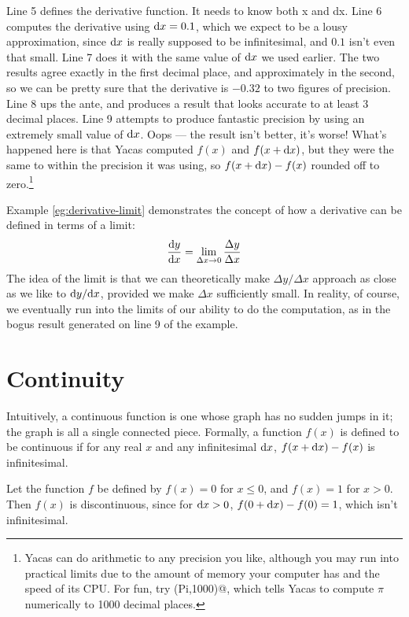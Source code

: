 Line 5 defines the derivative function. It needs to know both x and dx. Line
6 computes the derivative using $\textup{d} x=0.1$, which we expect to be a lousy approximation,
since $\textup{d} x$ is really supposed to be infinitesimal, and $0.1$ isn't even that small.
Line 7 does it with the same value of $\textup{d} x$ we used earlier. The two results agree
exactly in the first decimal place, and approximately in the second, so we can be
pretty sure that the derivative is $-0.32$ to two figures of precision. Line 8
ups the ante, and produces a result that looks accurate to at least 3 decimal places.
Line 9 attempts to produce fantastic precision by using an extremely small value of $\textup{d} x$.
Oops --- the result isn't better, it's worse! What's happened here is that Yacas
computed $f(x)$ and $f(x+\textup{d} x)$, but they were the same to within the precision it
was using, so $f(x+\textup{d} x)-f(x)$ rounded off to zero.\footnote{Yacas can do arithmetic
to any precision you like, although you may run into practical limits due to the amount
of memory your computer has and the speed of its CPU. For fun, try \verb@N(Pi,1000)@,
which tells Yacas to compute $\pi$ numerically to 1000 decimal places.}

Example \ref{eg:derivative-limit} demonstrates the concept of how a derivative can be
defined in terms of a limit:
\begin{equation*}
  \frac{\textup{d} y}{\textup{d} x} = \lim_{\Delta x\rightarrow 0} \frac{\Delta y}{\Delta x}
\end{equation*}
The idea of the limit is that we can theoretically make $\Delta y/\Delta x$ approach
as close as we like to $\textup{d} y/\textup{d} x$, provided we make $\Delta x$ sufficiently small.
In reality, of course, we eventually run into the limits of our ability to do the
computation, as in the bogus result generated on line 9 of the example.

\section{Continuity}

Intuitively, a continuous function is one whose graph
has no sudden jumps in it; the graph is all a single connected piece. Formally, a function $f(x)$ is defined to
be continuous if for any real $x$ and any infinitesimal $\textup{d} x$, $f(x+\textup{d} x)-f(x)$ is infinitesimal.

\begin{eg}
Let the function $f$ be defined by $f(x)=0$ for $x\le 0$, and $f(x)=1$ for $x>0$. Then $f(x)$ is
discontinuous, since for $\textup{d} x>0$, $f(0+\textup{d} x)-f(0)=1$, which isn't infinitesimal.
\end{eg}

